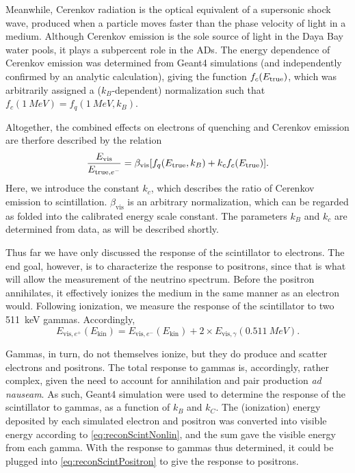 \documentclass[../thesis.tex]{subfiles}
\begin{document}
Meanwhile, Cerenkov radiation is the optical equivalent of a supersonic shock
wave, produced when a particle moves faster than the phase velocity of light in
a medium. Although Cerenkov emission is the sole source of light in the Daya Bay
water pools, it plays a subpercent role in the ADs. The energy dependence of
Cerenkov emission was determined from Geant4 simulations (and independently
confirmed by an analytic calculation), giving the function $f_c(E_\mathrm{true})$, which
was arbitrarily assigned a ($k_B$-dependent) normalization such that
$f_c(\SI{1}{MeV}) = f_q(\SI{1}{MeV}, k_B)$.

Altogether, the combined effects on electrons of quenching and Cerenkov emission
are therfore described by the relation
\begin{equation}
  \label{eq:reconScintNonlin}
  \frac{E_{\mathrm{vis}}}{E_{\mathrm{true},e^-}} = \beta_{\mathrm{vis}}[f_q(E_\mathrm{true}, k_B) + k_c f_c(E_\mathrm{true})].
\end{equation}
Here, we introduce the constant $k_c$, which describes the ratio of Cerenkov
emission to scintillation. $\beta_{\mathrm{vis}}$ is an arbitrary normalization,
which can be regarded as folded into the calibrated energy scale constant. The
parameters $k_B$ and $k_c$ are determined from data, as will be described
shortly.

Thus far we have only discussed the response of the scintillator to
electrons. The end goal, however, is to characterize the response to positrons,
since that is what will allow the measurement of the neutrino spectrum. Before
the positron annihilates, it effectively ionizes the medium in the same manner
as an electron would. Following ionization, we measure the response of the
scintillator to two 511~keV gammas. Accordingly,
\begin{equation}
  \label{eq:reconScintPositron}
  E_{\mathrm{vis},e^+}(E_{\mathrm{kin}}) = E_{\mathrm{vis},e^-}(E_{\mathrm{kin}}) + 2 \times E_{\mathrm{vis},\gamma}(\SI{0.511}{MeV}).
\end{equation}

Gammas, in turn, do not themselves ionize, but they do produce and scatter
electrons and positrons. The total response to gammas is, accordingly, rather
complex, given the need to account for annihilation and pair production \emph{ad
  nauseam}. As such, Geant4 simulation were used to determine the response of
the scintillator to gammas, as a function of $k_B$ and $k_C$. The (ionization)
energy deposited by each simulated electron and positron was converted into
visible energy according to \eqref{eq:reconScintNonlin}, and the sum gave the
visible energy from each gamma. With the response to gammas thus determined, it
could be plugged into \eqref{eq:reconScintPositron} to give the response to
positrons.
\end{document}
